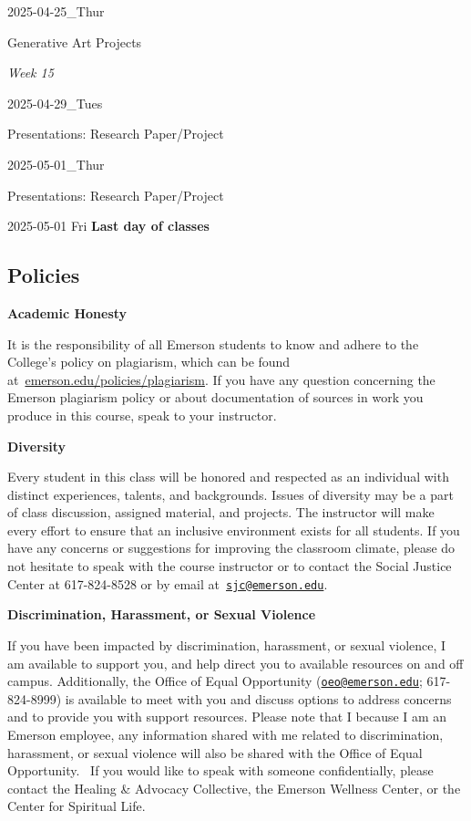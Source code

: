 \documentclass[
  letterpaper,
  DIV=11,
  numbers=noendperiod]{scrartcl}
\begin{document}
2025-04-25\_Thur

Generative Art Projects

\emph{Week 15}

2025-04-29\_Tues

Presentations: Research Paper/Project

2025-05-01\_Thur

Presentations: Research Paper/Project

2025-05-01 Fri \textbf{Last day of classes}

\subsection{Policies}\label{policies}

\textbf{Academic Honesty}

It is the responsibility of all Emerson students to know and adhere to
the College's policy on plagiarism, which can be found
at~\href{https://emerson.edu/policies/plagiarism}{emerson.edu/policies/plagiarism}.
If you have any question concerning the Emerson plagiarism policy or
about documentation of sources in work you produce in this course, speak
to your instructor.

\textbf{Diversity}

Every student in this class will be honored and respected as an
individual with distinct experiences, talents, and backgrounds. Issues
of diversity may be a part of class discussion, assigned material, and
projects. The instructor will make every effort to ensure that an
inclusive environment exists for all students. If you have any concerns
or suggestions for improving the classroom climate, please do not
hesitate to speak with the course instructor or to contact the Social
Justice Center at 617-824-8528 or by email
at~\href{mailto:sjc@emerson.edu}{\nolinkurl{sjc@emerson.edu}}.

\textbf{Discrimination, Harassment, or Sexual Violence}

If you have been impacted by discrimination, harassment, or sexual
violence, I am available to support you, and help direct you to
available resources on and off campus. Additionally, the Office of Equal
Opportunity (\href{mailto:oeo@emerson.edu}{\nolinkurl{oeo@emerson.edu}};
617-824-8999) is available to meet with you and discuss options to
address concerns and to provide you with support resources. Please note
that I because I am an Emerson employee, any information shared with me
related to discrimination, harassment, or sexual violence will also be
shared with the Office of Equal Opportunity. ~If you would like to speak
with someone confidentially, please contact the Healing \& Advocacy
Collective, the Emerson Wellness Center, or the Center for Spiritual
Life.
\end{document}
